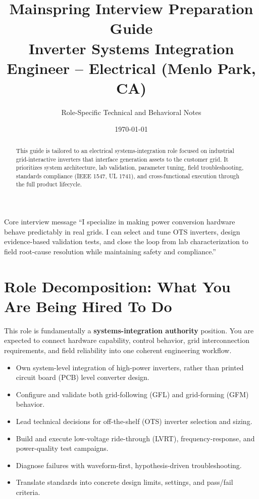 \documentclass[11pt]{article}
\title{\textbf{Mainspring Interview Preparation Guide}\\
\large Inverter Systems Integration Engineer -- Electrical (Menlo Park, CA)}
\author{Role-Specific Technical and Behavioral Notes}
\date{\today}
\begin{document}
\maketitle

\begin{abstract}
This guide is tailored to an electrical systems-integration role focused on
industrial grid-interactive inverters that interface generation assets to the
customer grid. It prioritizes system architecture, lab validation, parameter
tuning, field troubleshooting, standards compliance (IEEE 1547, UL 1741), and
cross-functional execution through the full product lifecycle.
\end{abstract}

\begin{keybox}{Core interview message}
``I specialize in making power conversion hardware behave predictably in real
grids. I can select and tune OTS inverters, design evidence-based validation
tests, and close the loop from lab characterization to field root-cause
resolution while maintaining safety and compliance.''
\end{keybox}

\tableofcontents
\newpage

\section{Role Decomposition: What You Are Being Hired To Do}

This role is fundamentally a \textbf{systems-integration authority} position.
You are expected to connect hardware capability, control behavior, grid
interconnection requirements, and field reliability into one coherent
engineering workflow.

\begin{itemize}
  \item Own system-level integration of high-power inverters, rather than printed circuit board (PCB) level converter design.
  \item Configure and validate both grid-following (GFL) and grid-forming (GFM) behavior.
  \item Lead technical decisions for off-the-shelf (OTS) inverter selection and sizing.
  \item Build and execute low-voltage ride-through (LVRT), frequency-response, and power-quality test campaigns.
  \item Diagnose failures with waveform-first, hypothesis-driven troubleshooting.
  \item Translate standards into concrete design limits, settings, and pass/fail criteria.
\end{itemize}
\end{document}
